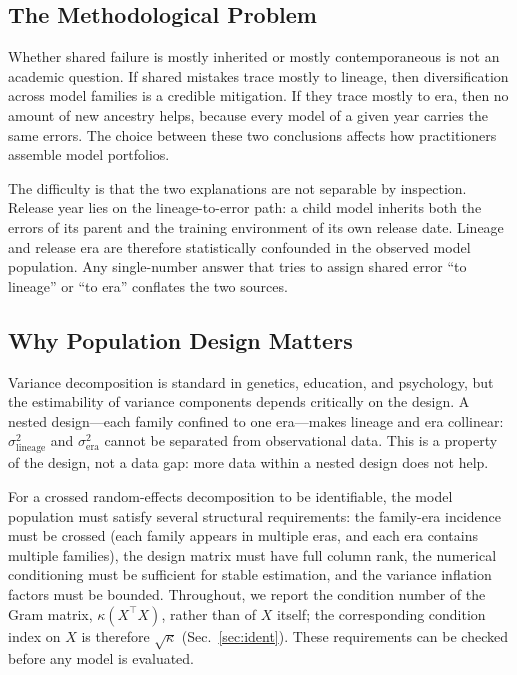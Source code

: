 \documentclass[11pt]{article}
\theoremstyle{definition}
\theoremstyle{plain}
\begin{document}
\subsection{The Methodological Problem}
Whether shared failure is mostly inherited or mostly contemporaneous is not an academic question. If shared mistakes trace mostly to lineage, then diversification across model families is a credible mitigation. If they trace mostly to era, then no amount of new ancestry helps, because every model of a given year carries the same errors. The choice between these two conclusions affects how practitioners assemble model portfolios.

The difficulty is that the two explanations are not separable by inspection. Release year lies on the lineage-to-error path: a child model inherits both the errors of its parent and the training environment of its own release date. Lineage and release era are therefore statistically confounded in the observed model population. Any single-number answer that tries to assign shared error ``to lineage'' or ``to era'' conflates the two sources.

\subsection{Why Population Design Matters}
Variance decomposition is standard in genetics, education, and psychology, but the estimability of variance components depends critically on the design. A nested design---each family confined to one era---makes lineage and era collinear: $\sigma^2_{\text{lineage}}$ and $\sigma^2_{\text{era}}$ cannot be separated from observational data. This is a property of the design, not a data gap: more data within a nested design does not help.

For a crossed random-effects decomposition to be identifiable, the model population must satisfy several structural requirements: the family-era incidence must be crossed (each family appears in multiple eras, and each era contains multiple families), the design matrix must have full column rank, the numerical conditioning must be sufficient for stable estimation, and the variance inflation factors must be bounded. Throughout, we report the condition number of the Gram matrix, $\kappa(X^\top X)$, rather than of $X$ itself; the corresponding condition index on $X$ is therefore $\sqrt{\kappa}$ (Sec.~\ref{sec:ident}). These requirements can be checked before any model is evaluated.
\end{document}
